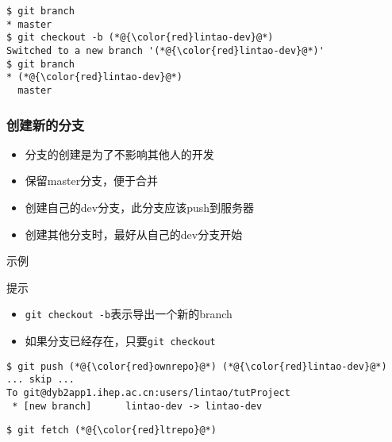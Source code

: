 \newsavebox{\QuickStartDybDevBranch}
\begin{lrbox}{\QuickStartDybDevBranch}
\begin{lstlisting}
$ git branch 
* master
$ git checkout -b (*@{\color{red}lintao-dev}@*)
Switched to a new branch '(*@{\color{red}lintao-dev}@*)'
$ git branch 
* (*@{\color{red}lintao-dev}@*)
  master
\end{lstlisting}
\end{lrbox}

\begin{frame}
    \frametitle{创建新的分支}
    \begin{itemize}    
        \item 分支的创建是为了不影响其他人的开发
        \item 保留master分支，便于合并
        \item 创建自己的dev分支，此分支应该push到服务器
        \item 创建其他分支时，最好从自己的dev分支开始
    \end{itemize}
    \begin{block}{示例}
        \par\usebox{\QuickStartDybDevBranch}
    \end{block}
    \begin{alertblock}{提示}
        \begin{itemize}    
            \item {\tt git checkout -b}表示导出一个新的branch
            \item 如果分支已经存在，只要{\tt git checkout}
        \end{itemize}
    \end{alertblock}
\end{frame}

\newsavebox{\QuickStartDybDevBranchPush}
\begin{lrbox}{\QuickStartDybDevBranchPush}
\begin{lstlisting}
$ git push (*@{\color{red}ownrepo}@*) (*@{\color{red}lintao-dev}@*)
... skip ...
To git@dyb2app1.ihep.ac.cn:users/lintao/tutProject
 * [new branch]      lintao-dev -> lintao-dev
\end{lstlisting}
\end{lrbox}

\newsavebox{\QuickStartDybDevBranchFetch}
\begin{lrbox}{\QuickStartDybDevBranchFetch}
\begin{lstlisting}
$ git fetch (*@{\color{red}ltrepo}@*)
\end{lstlisting}
\end{lrbox}


